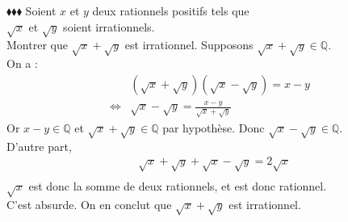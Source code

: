 \documentclass[11pt]{article}
\begin{document}
\begin{exercice}{$\blacklozenge\blacklozenge\blacklozenge$}{}
    Soient $x$ et $y$ deux rationnels positifs tels que \\$\sqrt{x}$ et $\sqrt{y}$ soient irrationnels.\\
    Montrer que $\sqrt{x} + \sqrt{y}$ est irrationnel.
    \tcblower
    Supposons $\sqrt{x}+\sqrt{y}\in\mathbb{Q}$.\\
    On a :
    \begin{align*}
        &(\sqrt{x}+\sqrt{y})(\sqrt{x}-\sqrt{y})=x-y\\
        \iff&\sqrt{x}-\sqrt{y}=\frac{x-y}{\sqrt{x}+\sqrt{y}}
    \end{align*}
    Or $x-y\in\mathbb{Q}$ et $\sqrt{x}+\sqrt{y}\in\mathbb{Q}$ par hypothèse. Donc $\sqrt{x}-\sqrt{y}\in\mathbb{Q}$.\\
    D'autre part,
    \begin{align*}
        &\sqrt{x}+\sqrt{y}+\sqrt{x}-\sqrt{y}=2\sqrt{x}\\
    \end{align*}
    $\sqrt{x}$ est donc la somme de deux rationnels, et est donc rationnel.\\
    C'est absurde. On en conclut que $\sqrt{x}+\sqrt{y}$ est irrationnel.
\end{exercice}
\end{document}
